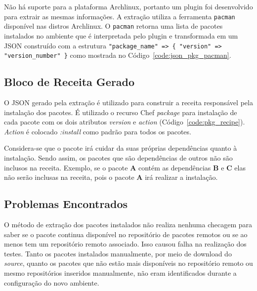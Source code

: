 Não há suporte para a plataforma Archlinux, portanto um plugin foi desenvolvido
para extrair as mesmas informações. A extração utiliza a ferramenta \texttt{pacman} disponível
nas distros Archlinux. O \texttt{pacman} retorna uma lista de pacotes instalados no ambiente
que é interpretada pelo plugin e transformada em um JSON construído com a estrutura
\texttt{"package\_name" => \{ "version" => "version\_number" \}} como mostrada no
Código~\ref{code:json_pkg_pacman}.

\noindent\begin{minipage}{\textwidth}
  \lstset{style=shell}
  
\end{minipage}\hfill

\subsection{Bloco de Receita Gerado}

O JSON gerado pela extração é utilizado para construir a receita responsável pela instalação dos
pacotes. É utilizado o recurso Chef \textit{package} para instalação de cada pacote com os dois atributos
\textit{version} e \textit{action} (Código~\ref{code:pkg_recipe}). \textit{Action} é colocado \textit{\textit{:install}}
como padrão para todos os pacotes.

\noindent\begin{minipage}{\textwidth}
  \lstset{style=shell}
  
\end{minipage}\hfill

Considera-se que o pacote irá cuidar da suas próprias dependências quanto à instalação.
Sendo assim, os pacotes que são dependências de outros não são inclusos na receita. Exemplo, se o pacote
\textbf{A} contém as dependências \textbf{B} e \textbf{C} elas não serão inclusas na receita, pois o pacote \textbf{A} irá realizar a instalação.

\subsection{Problemas Encontrados}

O método de extração dos pacotes instalados não realiza nenhuma checagem para
saber se o pacote continua disponível no repositório de pacotes remotos ou
se ao menos tem um repositório remoto associado. Isso causou falha na realização
dos testes. Tanto os pacotes instalados manualmente, por meio de download do
\textit{source}, quanto os pacotes que não estão mais disponíveis no repositório remoto ou
mesmo repositórios inseridos manualmente, não eram identificados durante a
configuração do novo ambiente.

